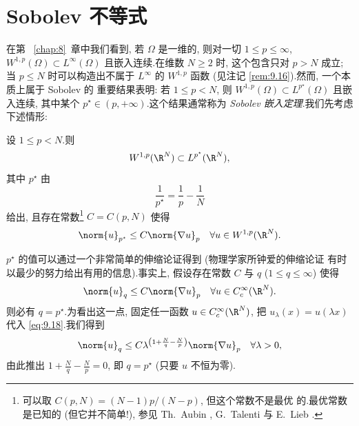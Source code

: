 \section{Sobolev 不等式}
\label{sec:9.3}

在第~
\ref{chap:8}~章中我们看到, 若 $\Omega$ 是一维的, 则对一切 $1\le p\le\infty$,
$W^{1,p}(\Omega)\subset L^\infty(\Omega)$ 且嵌入连续.在维数 $N\ge2$ 时,
这个包含只对 $p>N$ 成立; 当 $p\le N$ 时可以构造出不属于 $L^\infty$ 的
$W^{1,p}$ 函数 (见注记 \ref{rem:9.16}).然而, 一个本质上属于 Sobolev 的
重要结果表明: 若 $1\le p<N$, 则 $W^{1,p}(\Omega)\subset L^{p^\star}(\Omega)$
且嵌入连续, 其中某个 $p^\star\in(p,+\infty)$.这个结果通常称为
\emph{Sobolev 嵌入定理}.我们先考虑下述情形:


\begin{keytheorem}
\label{thm:9.9}
设 $1\le p<N$.则
\begin{equation*}
W^{1,p}(\R^N)\subset L^{p^\star}(\R^N),
\end{equation*}
其中 $p^\star$ 由
\begin{equation*}
\frac1{p^\star}=\frac1p-\frac1N
\end{equation*}
给出, 且存在常数\footnote{可以取 $C(p,N)=(N-1)p/(N-p)$, 但这个常数不是最优
的.最优常数是已知的 (但它并不简单!), 参见 Th.~Aubin , G.~Talenti  与 E.~Lieb .}
$C=C(p,N)$ 使得
\begin{equation}
\norm{u}_{p^\star}\le C\norm{\nabla u}_p
\quad\forall u\in W^{1,p}(\R^N).
\label{eq:9.17}
\end{equation}
\end{keytheorem}

\begin{remark}
\label{rem:9.10}
$p^\star$ 的值可以通过一个非常简单的伸缩论证得到 (物理学家所钟爱的伸缩论证
有时以最少的努力给出有用的信息).事实上, 假设存在常数 $C$ 与 $q$
($1\le q\le\infty$) 使得
\begin{equation}
\norm{u}_q\le C\norm{\nabla u}_p\quad\forall u\in C_c^\infty(\R^N).
\label{eq:9.18}
\end{equation}
则必有 $q=p^\star$.为看出这一点, 固定任一函数
$u\in C_c^\infty(\R^N)$, 把 $u_\lambda(x)=u(\lambda x)$ 代入
\eqref{eq:9.18}.我们得到
\begin{equation*}
\norm{u}_q\le C\lambda^{\left(1+\frac Nq-\frac Np\right)}
\norm{\nabla u}_p\quad\forall\lambda>0,
\end{equation*}
由此推出 $1+\frac Nq-\frac Np=0$, 即 $q=p^\star$ (只要 $u$ 不恒为零).
\end{remark}

